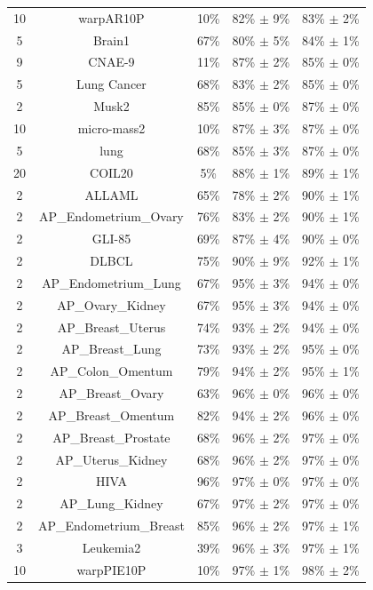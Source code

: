 \documentclass[preprint,12pt,authoryear]{elsarticle}
\begin{document}
{\begin{longtable}{|c|c|c|c|c|}
10 & warpAR10P & 10\% & 82\% $\pm$ 9\% & 83\% $\pm$ 2\% \\
5 & Brain1 & 67\% & 80\% $\pm$ 5\% & 84\% $\pm$ 1\% \\
9 & CNAE-9 & 11\% & 87\% $\pm$ 2\% & 85\% $\pm$ 0\% \\
5 & Lung Cancer & 68\% & 83\% $\pm$ 2\% & 85\% $\pm$ 0\% \\
2 & Musk2 & 85\% & 85\% $\pm$ 0\% & 87\% $\pm$ 0\% \\
10 & micro-mass2 & 10\% & 87\% $\pm$ 3\% & 87\% $\pm$ 0\% \\
5 & lung & 68\% & 85\% $\pm$ 3\% & 87\% $\pm$ 0\% \\
20 & COIL20 & 5\% & 88\% $\pm$ 1\% & 89\% $\pm$ 1\% \\
2 & ALLAML & 65\% & 78\% $\pm$ 2\% & 90\% $\pm$ 1\% \\
2 & AP\_Endometrium\_Ovary & 76\% & 83\% $\pm$ 2\% & 90\% $\pm$ 1\% \\
2 & GLI-85 & 69\% & 87\% $\pm$ 4\% & 90\% $\pm$ 0\% \\
2 & DLBCL & 75\% & 90\% $\pm$ 9\% & 92\% $\pm$ 1\% \\
2 & AP\_Endometrium\_Lung & 67\% & 95\% $\pm$ 3\% & 94\% $\pm$ 0\% \\
2 & AP\_Ovary\_Kidney & 67\% & 95\% $\pm$ 3\% & 94\% $\pm$ 0\% \\
2 & AP\_Breast\_Uterus & 74\% & 93\% $\pm$ 2\% & 94\% $\pm$ 0\% \\
2 & AP\_Breast\_Lung & 73\% & 93\% $\pm$ 2\% & 95\% $\pm$ 0\% \\
2 & AP\_Colon\_Omentum & 79\% & 94\% $\pm$ 2\% & 95\% $\pm$ 1\% \\
2 & AP\_Breast\_Ovary & 63\% & 96\% $\pm$ 0\% & 96\% $\pm$ 0\% \\
2 & AP\_Breast\_Omentum & 82\% & 94\% $\pm$ 2\% & 96\% $\pm$ 0\% \\
2 & AP\_Breast\_Prostate & 68\% & 96\% $\pm$ 2\% & 97\% $\pm$ 0\% \\
2 & AP\_Uterus\_Kidney & 68\% & 96\% $\pm$ 2\% & 97\% $\pm$ 0\% \\
2 & HIVA & 96\% & 97\% $\pm$ 0\% & 97\% $\pm$ 0\% \\
2 & AP\_Lung\_Kidney & 67\% & 97\% $\pm$ 2\% & 97\% $\pm$ 0\% \\
2 & AP\_Endometrium\_Breast & 85\% & 96\% $\pm$ 2\% & 97\% $\pm$ 1\% \\
3 & Leukemia2 & 39\% & 96\% $\pm$ 3\% & 97\% $\pm$ 1\% \\
10 & warpPIE10P & 10\% & 97\% $\pm$ 1\% & 98\% $\pm$ 2\% \\

\end{longtable}}
\end{document}
